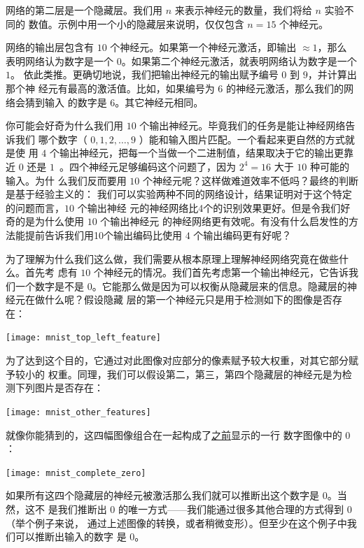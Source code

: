 网络的第二层是一个隐藏层。我们用 $n$ 来表示神经元的数量，我们将给 $n$ 实验不同的
数值。示例中用一个小的隐藏层来说明，仅仅包含 $n=15$ 个神经元。

网络的输出层包含有 $10$ 个神经元。如果第一个神经元激活，即输出 $\approx 1$，那么
表明网络认为数字是一个 $0$。如果第二个神经元激活，就表明网络认为数字是一个 $1$。
依此类推。更确切地说，我们把输出神经元的输出赋予编号 $0$ 到 $9$，并计算出那个神
经元有最高的激活值。比如，如果编号为 $6$ 的神经元激活，那么我们的网络会猜到输入
的数字是 $6$。其它神经元相同。

你可能会好奇为什么我们用 $10$ 个输出神经元。毕竟我们的任务是能让神经网络告诉我们
哪个数字（ $0, 1, 2, \ldots, 9$ ）能和输入图片匹配。一个看起来更自然的方式就是使
用 $4$ 个输出神经元，把每一个当做一个二进制值，结果取决于它的输出更靠近 $0$ 还是
$1$~。四个神经元足够编码这个问题了，因为 $2^4 = 16$ 大于 $10$ 种可能的输入。为什
么我们反而要用 $10$ 个神经元呢？这样做难道效率不低吗？最终的判断是基于经验主义的：
我们可以实验两种不同的网络设计，结果证明对于这个特定的问题而言，$10$ 个输出神经
元的神经网络比4个的识别效果更好。但是令我们好奇的是为什么使用 $10$ 个输出神经元
的神经网络更有效呢。有没有什么启发性的方法能提前告诉我们用10个输出编码比使用 $4$
个输出编码更有好呢？

为了理解为什么我们这么做，我们需要从根本原理上理解神经网络究竟在做些什么。首先考
虑有 $10$ 个神经元的情况。我们首先考虑第一个输出神经元，它告诉我们一个数字是不是
0。它能那么做是因为可以权衡从隐藏层来的信息。隐藏层的神经元在做什么呢？假设隐藏
层的第一个神经元只是用于检测如下的图像是否存在：
\begin{center}
  \texttt{[image: mnist\_top\_left\_feature]}
\end{center}

为了达到这个目的，它通过对此图像对应部分的像素赋予较大权重，对其它部分赋予较小的
权重。同理，我们可以假设第二，第三，第四个隐藏层的神经元是为检测下列图片是否存在：
\begin{center}
  \texttt{[image: mnist\_other\_features]}
\end{center}

就像你能猜到的，这四幅图像组合在一起构成了\hyperref[fig:digits]{之前}显示的一行
数字图像中的 $0$：
\begin{center}
  \texttt{[image: mnist\_complete\_zero]}
\end{center}

如果所有这四个隐藏层的神经元被激活那么我们就可以推断出这个数字是 $0$。当然，这不
是我们推断出 $0$ 的唯一方式——我们能通过很多其他合理的方式得到 $0$ （举个例子来说，
  通过上述图像的转换，或者稍微变形）。但至少在这个例子中我们可以推断出输入的数字
是 $0$。

